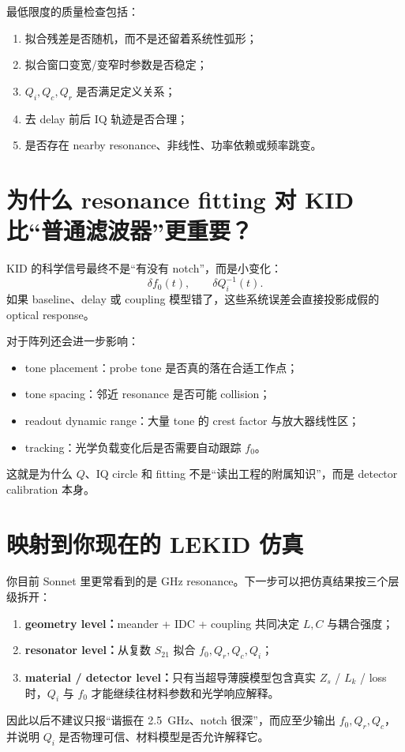 \documentclass[11pt,a4paper,openany]{ctexrep}
\begin{document}
最低限度的质量检查包括：
\begin{enumerate}
  \item 拟合残差是否随机，而不是还留着系统性弧形；
  \item 拟合窗口变宽/变窄时参数是否稳定；
  \item $Q_i,Q_c,Q_r$ 是否满足定义关系；
  \item 去 delay 前后 IQ 轨迹是否合理；
  \item 是否存在 nearby resonance、非线性、功率依赖或频率跳变。
\end{enumerate}

\section{为什么 resonance fitting 对 KID 比“普通滤波器”更重要？}

KID 的科学信号最终不是“有没有 notch”，而是小变化：
\[
\delta f_0(t),
\qquad
\delta Q_i^{-1}(t).
\]
如果 baseline、delay 或 coupling 模型错了，这些系统误差会直接投影成假的 optical response。

对于阵列还会进一步影响：
\begin{itemize}
  \item tone placement：probe tone 是否真的落在合适工作点；
  \item tone spacing：邻近 resonance 是否可能 collision；
  \item readout dynamic range：大量 tone 的 crest factor 与放大器线性区；
  \item tracking：光学负载变化后是否需要自动跟踪 $f_0$。
\end{itemize}

这就是为什么 $Q$、IQ circle 和 fitting 不是“读出工程的附属知识”，而是 detector calibration 本身。

\section{映射到你现在的 LEKID 仿真}

\begin{projectbox}
你目前 Sonnet 里更常看到的是 GHz resonance。下一步可以把仿真结果按三个层级拆开：
\begin{enumerate}
  \item \textbf{geometry level：}meander + IDC + coupling 共同决定 $L,C$ 与耦合强度；
  \item \textbf{resonator level：}从复数 $S_{21}$ 拟合 $f_0,Q_r,Q_c,Q_i$；
  \item \textbf{material / detector level：}只有当超导薄膜模型包含真实 $Z_s$ / $L_k$ / loss 时，$Q_i$ 与 $f_0$ 才能继续往材料参数和光学响应解释。
\end{enumerate}
因此以后不建议只报“谐振在 \SI{2.5}{GHz}、notch 很深”，而应至少输出 $f_0,Q_r,Q_c$，并说明 $Q_i$ 是否物理可信、材料模型是否允许解释它。
\end{projectbox}
\end{document}
